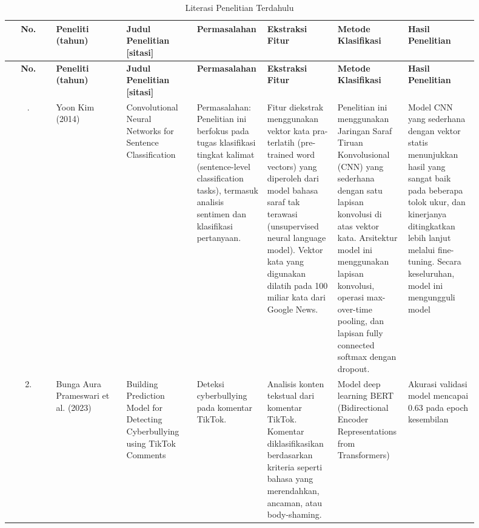 \begin{sidewaystable}

\begin{longtable}{|c|p{0.15\linewidth}|p{0.15\linewidth}|p{0.15\linewidth}|p{0.15\linewidth}|p{0.15\linewidth}|p{0.15\linewidth}|}
  \caption{Literasi Penelitian Terdahulu}\label{table:2.literasi}\\
  \hline
  \textbf{No.} 
    & \textbf{Peneliti (tahun)} 
    & \textbf{Judul Penelitian [sitasi]} 
    & \textbf{Permasalahan} 
    & \textbf{Ekstraksi Fitur}
    & \textbf{Metode Klasifikasi}
    & \textbf{Hasil Penelitian} \\
  \hline
\endfirsthead
  \hline
  \textbf{No.} 
    & \textbf{Peneliti (tahun)} 
    & \textbf{Judul Penelitian [sitasi]} 
    & \textbf{Permasalahan} 
    & \textbf{Ekstraksi Fitur}
    & \textbf{Metode Klasifikasi}
    & \textbf{Hasil Penelitian} \\
  \hline
\endhead 
  \hline
\endfoot
  \hline
\endlastfoot
  1. & Yoon Kim (2014) & Convolutional Neural Networks for Sentence Classification & Permasalahan: Penelitian ini berfokus pada tugas klasifikasi tingkat kalimat (sentence-level classification tasks), termasuk analisis sentimen dan klasifikasi pertanyaan. & Fitur diekstrak menggunakan vektor kata pra-terlatih (pre-trained word vectors) yang diperoleh dari model bahasa saraf tak terawasi (unsupervised neural language model). Vektor kata yang digunakan dilatih pada 100 miliar kata dari Google News. & Penelitian ini menggunakan Jaringan Saraf Tiruan Konvolusional (CNN) yang sederhana dengan satu lapisan konvolusi di atas vektor kata. Arsitektur model ini menggunakan lapisan konvolusi, operasi max-over-time pooling, dan lapisan fully connected softmax dengan dropout. & Model CNN yang sederhana dengan vektor statis menunjukkan hasil yang sangat baik pada beberapa tolok ukur, dan kinerjanya ditingkatkan lebih lanjut melalui fine-tuning. Secara keseluruhan, model ini mengungguli model  \\
  \hline
  2. & Bunga Aura Prameswari et al. (2023) & Building Prediction Model for Detecting Cyberbullying using TikTok Comments & Deteksi cyberbullying pada komentar TikTok. & Analisis konten tekstual dari komentar TikTok. Komentar diklasifikasikan berdasarkan kriteria seperti bahasa yang merendahkan, ancaman, atau body-shaming. & Model deep learning BERT (Bidirectional Encoder Representations from Transformers) & Akurasi validasi model mencapai 0.63 pada epoch kesembilan \\
  \hline
\end{longtable}

\end{sidewaystable}

